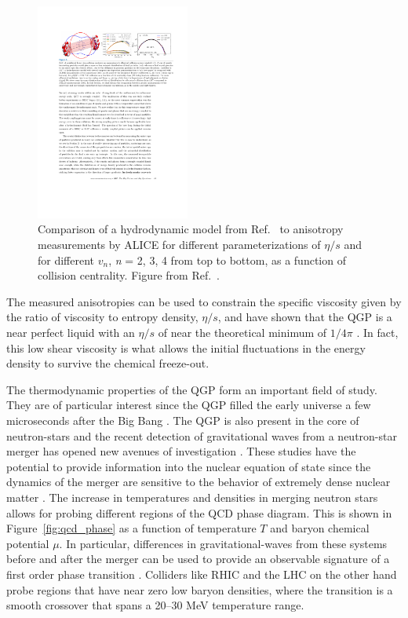 \begin{figure}[htbp]
\begin{center}
\includegraphics[width=0.45\textwidth]{figures/theory/flow_coefficients}
\caption{Comparison of a hydrodynamic model from Ref.~\cite{Niemi:2015qia} to anisotropy measurements by ALICE \cite{ALICE:2011ab} for different parameterizations of $\eta / s $ and for different $v_n$, {\it{n}} = 2, 3, 4 from top to bottom, as a function of collision centrality.
Figure from Ref.~\cite{Busza:2018rrf}.}
\label{fig:flow_coeff}
\end{center}
\end{figure}

The measured anisotropies can be used to constrain the specific viscosity given by the ratio of viscosity to entropy density, $\eta / s$, and have shown that the QGP is a near perfect liquid with an $\eta / s$ of near the theoretical minimum of $1/4\pi$ \cite{ARSENE20051, GYULASSY200530}.
In fact, this low shear viscosity is what allows the initial fluctuations in the energy density to survive the chemical freeze-out.



The thermodynamic properties of the QGP form an important field of study.
They are of particular interest since the QGP filled the early universe a few microseconds after the Big Bang \cite{PhysRevLett.34.1353}.
The QGP is also present in the core of neutron-stars \cite{Linde_1979} and the recent detection of gravitational waves from a neutron-star merger \cite{PhysRevLett.119.161101} has opened new avenues of investigation \cite{Han:2018mtj, PhysRevD.99.023009, PhysRevLett.122.061101}.
These studies have the potential to provide information into the nuclear equation of state since the dynamics of the merger are sensitive to the behavior of extremely dense nuclear matter \cite{PhysRevD.86.063001}.
The increase in temperatures and densities in merging neutron stars allows for probing different regions of the QCD phase diagram.
This is shown in Figure~\ref{fig:qcd_phase} as a function of temperature $T$ and baryon chemical potential $\mu$.
In particular, differences in gravitational-waves from these systems before and after the merger can be used to provide an observable signature of a first order phase transition \cite{PhysRevLett.122.061102}.
Colliders like RHIC and the LHC on the other hand probe regions that have near zero low baryon densities, where the transition is a smooth crossover that spans a 20--30 MeV temperature range.



